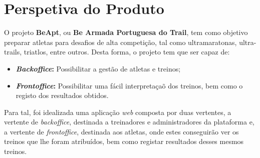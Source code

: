 \section{Perspetiva do Produto}

O projeto \textbf{BeApt}, ou \textbf{Be Armada Portuguesa do Trail}, tem como objetivo preparar atletas para desafios de alta competição, tal como ultramaratonas, ultra-trails, triatlos, entre outros. Desta forma, o projeto tem que ser capaz de:

\begin{itemize}
	\item \textbf{\textit{Backoffice}:} Possibilitar a gestão de atletas e treinos;
	\item \textbf{\textit{Frontoffice}:} Possibilitar uma fácil interpretaçaõ dos treinos, bem como o registo dos resultados obtidos.
\end{itemize}

Para tal, foi idealizada uma aplicação \textit{web} composta por duas vertentes, a vertente de \textit{backoffice}, destinada a treinadores e administradores da plataforma e, a vertente de \textit{frontoffice}, destinada aos atletas, onde estes conseguirão ver os treinos que lhe foram atribuídos, bem como registar resultados desses mesmos treinos.